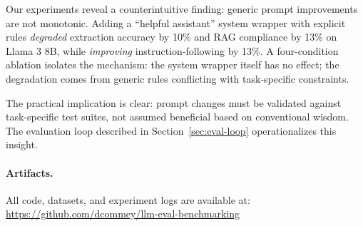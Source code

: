 Our experiments reveal a counterintuitive finding: generic prompt improvements are not monotonic. Adding a ``helpful assistant'' system wrapper with explicit rules \emph{degraded} extraction accuracy by 10\% and RAG compliance by 13\% on Llama 3 8B, while \emph{improving} instruction-following by 13\%. A four-condition ablation isolates the mechanism: the system wrapper itself has no effect; the degradation comes from generic rules conflicting with task-specific constraints.

The practical implication is clear: prompt changes must be validated against task-specific test suites, not assumed beneficial based on conventional wisdom. The evaluation loop described in Section~\ref{sec:eval-loop} operationalizes this insight.

\paragraph{Artifacts.} All code, datasets, and experiment logs are available at: \url{https://github.com/dcommey/llm-eval-benchmarking}

